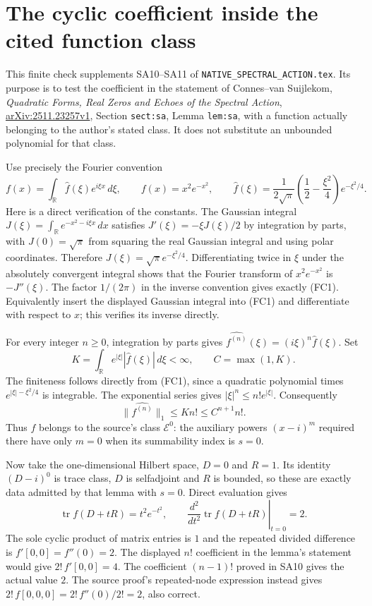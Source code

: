 \endgroup

\clearpage\begingroup
\part*{The cyclic coefficient inside the cited function class}



This finite check supplements SA10--SA11 of
\texttt{NATIVE\_SPECTRAL\_ACTION.tex}. Its purpose is to test
the coefficient in the statement of Connes--van Suijlekom,
\emph{Quadratic Forms, Real Zeros and Echoes of the Spectral Action},
\href{https://arxiv.org/abs/2511.23257v1}{arXiv:2511.23257v1},
Section \texttt{sect:sa}, Lemma \texttt{lem:sa}, with a
function actually belonging to the author's stated class.
It does not substitute an unbounded polynomial for that class.

Use precisely the Fourier convention
\[
f(x)=\int_{\mathbb R}\widehat f(\xi)e^{i\xi x}\,d\xi,
\qquad
f(x)=x^2e^{-x^2},\qquad
\widehat f(\xi)=\frac1{2\sqrt\pi}
\left(\frac12-\frac{\xi^2}{4}\right)e^{-\xi^2/4}.
\tag{FC1}
\]
Here is a direct verification of the constants.
The Gaussian integral
$J(\xi)=\int_{\mathbb R}e^{-x^2-i\xi x}\,dx$ satisfies
$J'(\xi)=-\xi J(\xi)/2$ by integration by parts, with
$J(0)=\sqrt\pi$ from squaring the real Gaussian integral
and using polar coordinates. Therefore
$J(\xi)=\sqrt\pi e^{-\xi^2/4}$.
Differentiating twice in $\xi$ under the absolutely
convergent integral shows that the Fourier transform
of $x^2e^{-x^2}$ is $-J''(\xi)$.
The factor $1/(2\pi)$ in the inverse convention gives
exactly (FC1). Equivalently insert the displayed
Gaussian integral into (FC1) and differentiate with
respect to $x$; this verifies its inverse directly.

For every integer $n\geq0$, integration by parts gives
$\widehat{f^{(n)}}(\xi)=(i\xi)^n\widehat f(\xi)$.
Set
\[
K=\int_{\mathbb R}e^{|\xi|}|\widehat f(\xi)|\,d\xi<\infty,
\qquad C=\max(1,K).
\tag{FC2}
\]
The finiteness follows directly from (FC1), since a
quadratic polynomial times $e^{|\xi|-\xi^2/4}$ is
integrable. The exponential series gives
$|\xi|^n\leq n!e^{|\xi|}$. Consequently
\[
\|\widehat{f^{(n)}}\|_1
\leq K n!\leq C^{n+1}n!.
\tag{FC3}
\]
Thus $f$ belongs to the source's class $\mathcal E^0$:
the auxiliary powers $(x-i)^m$ required there have
only $m=0$ when its summability index is $s=0$.

Now take the one-dimensional Hilbert space, $D=0$ and
$R=1$. Its identity $(D-i)^0$ is trace class, $D$ is
selfadjoint and $R$ is bounded, so these are exactly
data admitted by that lemma with $s=0$. Direct evaluation
gives
\[
\operatorname{tr}f(D+tR)=t^2e^{-t^2},\qquad
\left.\frac{d^2}{dt^2}\operatorname{tr}f(D+tR)\right|_{t=0}
=2.
\tag{FC4}
\]
The sole cyclic product of matrix entries is $1$ and
the repeated divided difference is
$f'[0,0]=f''(0)=2$.
The displayed $n!$ coefficient in the lemma's statement
would give $2!\,f'[0,0]=4$. The coefficient
$(n-1)!$ proved in SA10 gives the actual value $2$.
The source proof's repeated-node expression instead
gives $2!\,f[0,0,0]=2!\,f''(0)/2!=2$, also correct.

